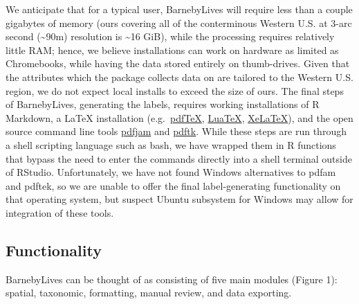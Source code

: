 \documentclass[
]{article}
\begin{document}
We anticipate that for a typical user, BarnebyLives will require less
than a couple gigabytes of memory (ours covering all of the conterminous
Western U.S. at 3-arc second (\textasciitilde90m) resolution is
\textasciitilde16 GiB), while the processing requires relatively little
RAM; hence, we believe installations can work on hardware as limited as
Chromebooks, while having the data stored entirely on thumb-drives.
Given that the attributes which the package collects data on are
tailored to the Western U.S. region, we do not expect local installs to
exceed the size of ours. The final steps of BarnebyLives, generating the
labels, requires working installations of R Markdown, a LaTeX
installation
(e.g.~\href{https://www.tug.org/applications/pdftex/}{pdfTeX},
\href{https://www.luatex.org/}{LuaTeX},
\href{https://www.overleaf.com/learn/latex/XeLaTeX}{XeLaTeX}), and the
open source command line tools
\href{https://github.com/rrthomas/pdfjam}{pdfjam} and
\href{https://linux.die.net/man/1/pdftk}{pdftk}. While these steps are
run through a shell scripting language such as bash, we have wrapped
them in R functions that bypass the need to enter the commands directly
into a shell terminal outside of RStudio. Unfortunately, we have not
found Windows alternatives to pdfam and pdftek, so we are unable to
offer the final label-generating functionality on that operating system,
but suspect Ubuntu subsystem for Windows may allow for integration of
these tools.

\subsection{Functionality}\label{functionality}

BarnebyLives can be thought of as consisting of five main modules
(Figure 1): spatial, taxonomic, formatting, manual review, and data
exporting.
\end{document}
